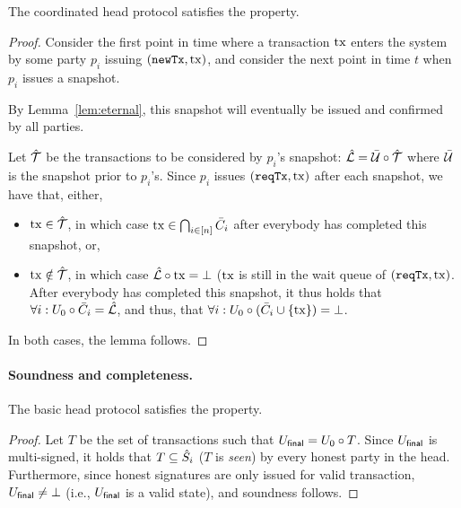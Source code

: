 \begin{lemma}
  \label{lem:liveness}
  The coordinated head protocol satisfies the  property.
\end{lemma}
\begin{proof}
  Consider the first point in time where a transaction $\mathrm{tx}$ enters the system by some party $p_i$
  issuing $(\mathtt{newTx},\mathrm{tx})$, and consider the next point in time
  $t$ when $p_i$ issues a snapshot.

  By Lemma~\ref{lem:eternal}, this snapshot will eventually be issued and confirmed by all parties.
  
  \medskip
  
  Let $\hat {\mathcal T}$ be the transactions to be considered by $p_i$'s snapshot: $\hat {\mathcal L}=\bar {\mathcal U}\circ\hat {\mathcal T}$
  where $\bar {\mathcal U}$ is the snapshot prior to $p_i$'s. Since $p_i$ issues
  $(\mathtt{reqTx},\mathrm{tx})$ after each snapshot, we have that, either,
  \begin{itemize}
      \item $\mathrm{tx}\in\hat {\mathcal T}$, in which case $\mathrm{tx} \in \bigcap_{i\in[n]} \bar{C}_i$ after everybody has completed this snapshot, or,
      \item $\mathrm{tx}\notin\hat {\mathcal T}$, in which case $\hat {\mathcal L}\circ\mathrm{tx}=\bot$ ($\mathrm{tx}$ is still in the wait queue of $(\mathtt{reqTx},\mathrm{tx})$. After everybody has completed this snapshot, it thus holds that $\forall i: U_{0}\circ\bar{C}_i=\hat {\mathcal L}$, and thus, that
      $\forall i: U_{0}\circ(\bar{C}_i\cup\{\mathrm{tx}\})=\bot$.
  \end{itemize}
  In both cases, the lemma follows.
\end{proof}

\paragraph{Soundness and completeness.}

\begin{lemma}[Soundness]
  \label{lem:soundness}
  The basic head protocol satisfies the  property.
\end{lemma}

\begin{proof}
  Let $T$ be the set of transactions such that $U_{\mathsf{final}}=U_0\circ T$.
  Since $U_{\mathsf{final}}$ is multi-signed, it holds that $T\subseteq\hat{S}_i$
  ($T$ is \emph{seen}) by every honest party in the head.
  Furthermore, since honest signatures are only issued for valid transaction,
  $U_{\mathsf{final}}\not=\bot$ (i.e., $U_{\mathsf{final}}$ is a valid state), and soundness
  follows.
\end{proof}



